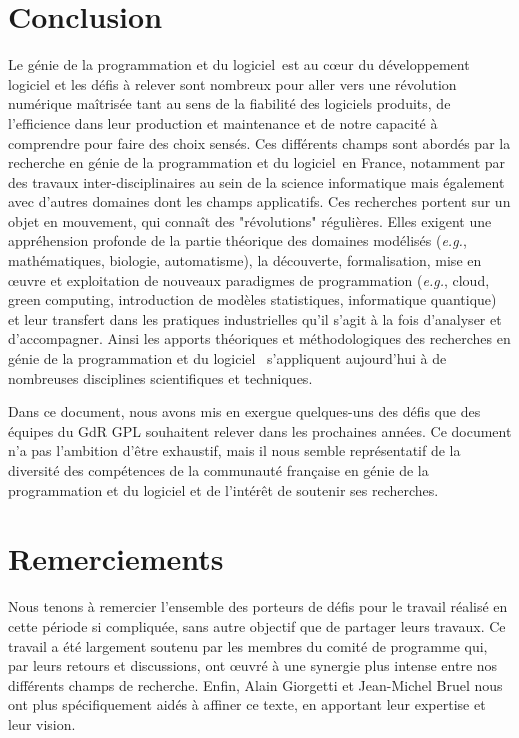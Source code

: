 \documentclass[11pt]{article}
\newcommand{\gpl}[0]{génie de la programmation et du logiciel\xspace}
\newcommand{\GDR}{GdR\xspace}
\newcommand{\eg}[0]{\emph{e.g.},\xspace}
\begin{document}
\section{Conclusion}
Le \gpl~est au c{\oe}ur du développement logiciel et les défis à relever sont nombreux pour aller vers une révolution numérique  maîtrisée tant au sens de la fiabilité des logiciels produits, de l'efficience dans leur production et maintenance et de notre capacité à comprendre pour faire des choix sensés. Ces différents champs sont abordés par la recherche en \gpl~en France, notamment par des travaux inter-disciplinaires au sein de la science informatique mais également avec d'autres domaines dont les champs applicatifs. 
Ces recherches  portent sur un objet en mouvement, qui connaît des "révolutions" régulières. Elles
exigent une appréhension profonde de la partie théorique des domaines modélisés (\eg mathématiques, biologie, automatisme), la découverte, formalisation, mise en {\oe}uvre et exploitation de nouveaux paradigmes de programmation (\eg  cloud, green computing, introduction de modèles statistiques, informatique quantique) et leur transfert dans les pratiques industrielles qu'il s'agit à la fois d'analyser et d'accompagner. 
Ainsi les apports théoriques et méthodologiques des recherches en \gpl~ s’appliquent aujourd'hui à de nombreuses disciplines scientifiques et techniques.

Dans ce document, nous avons mis en exergue quelques-uns des défis que des
équipes du {\GDR} GPL souhaitent relever dans les prochaines années. Ce document
n’a pas l’ambition d’être exhaustif, mais il nous semble représentatif de la diversité
des compétences de la communauté française en \gpl et de l’intérêt de soutenir ses
recherches.


\section*{Remerciements}
Nous tenons à remercier l'ensemble des porteurs de défis pour le travail réalisé en cette période si compliquée, sans autre objectif que de partager leurs travaux. Ce travail a été largement soutenu par les membres du comité de programme qui, par leurs retours et discussions, ont {\oe}uvré à une synergie plus intense entre nos différents champs de recherche.
Enfin, Alain Giorgetti et Jean-Michel Bruel nous ont plus spécifiquement aidés à affiner ce texte, en apportant leur expertise et leur vision.
\end{document}
